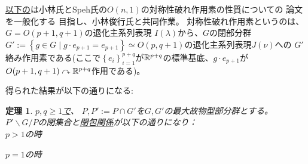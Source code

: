 \documentclass[a4paper,10pt]{article} %
\newcommand{\assign}{:=}
\newtheorem{theorem}{定理}
\begin{document}
\uline{以下の}は小林氏とSpeh氏の$O(n,1)$の対称性破れ作用素の性質についての
論文\cite{kobayashi2015symmetry}を一般化する
目指し、小林俊行氏と共同作業。
対称性破れ作用素というのは、$G=O(p+1,q+1)$の退化主系列表現
$I(\lambda)$から、$G$の閉部分群$G':=\left\{ g\in G\mid g\cdot e_{p+1}=e_{p+1} \right\}\simeq O(p,q+1)$の退化主系列表現$J(\nu)$への
$G'$絡み作用素である(ここで$\left\{ e_i \right\}_{i=1}^{p+q}$が$\mathbb{R}^{p+q}$の標準基底、$g\cdot e_{p+1}$が$O(p+1,q+1)\curvearrowright\mathbb{R}^{p+q}$作用である)。

得られた結果が以下の通りになる:

\begin{theorem}
$p, q \geqslant 1$\uline{で}、 $P,P':=P\cap G'$を$G,G'$の最大故物型部分群とする。
  $P'\backslash G/P$の閉集合と\uline{閉包関係}が以下の通りになり：\\
  $p>1$の時
  \begin{figure}[H]\centerline{}\end{figure}
  $p=1$の時
  \begin{figure}[H]\centerline{}\end{figure}
\end{theorem}
\end{document}
